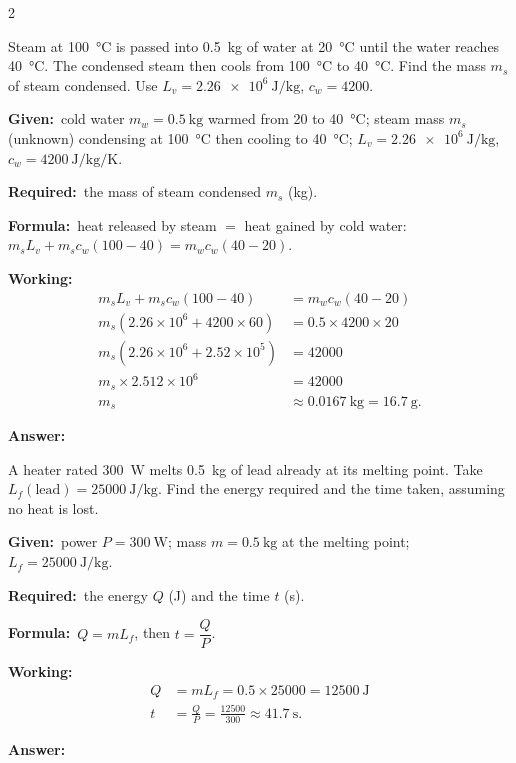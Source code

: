 \documentclass[10pt]{article}
\newcommand{\Given}{\par\vspace{2pt}\textbf{Given:}\ }
\newcommand{\Required}{\par\vspace{2pt}\textbf{Required:}\ }
\newcommand{\Formula}{\par\vspace{2pt}\textbf{Formula:}\ }
\newcommand{\Working}{\par\vspace{2pt}\textbf{Working:}}
\newcommand{\Answer}[1]{\par\vspace{2pt}\textbf{Answer:}\ \fbox{#1}}
\begin{document}
\begin{multicols}{2}
\begin{example}
Steam at \SI{100}{\degreeCelsius} is passed into \SI{0.5}{\kilogram} of
water at \SI{20}{\degreeCelsius} until the water reaches
\SI{40}{\degreeCelsius}. The condensed steam then cools from
\SI{100}{\degreeCelsius} to \SI{40}{\degreeCelsius}. Find the mass $m_s$
of steam condensed. Use
$L_v=\SI{2.26e6}{\joule\per\kilogram}$, $c_w=4200$.
\tcblower
\Given cold water $m_w = \SI{0.5}{\kilogram}$ warmed from
\SI{20}{} to \SI{40}{\degreeCelsius}; steam mass $m_s$ (unknown)
condensing at \SI{100}{\degreeCelsius} then cooling to
\SI{40}{\degreeCelsius}; $L_v=\SI{2.26e6}{\joule\per\kilogram}$,
$c_w=\SI{4200}{\joule\per\kilogram\per\kelvin}$.
\Required the mass of steam condensed $m_s$ (\si{\kilogram}).
\Formula heat released by steam $=$ heat gained by cold water:
$m_s L_v + m_s c_w(100-40) = m_w c_w(40-20)$.
\Working
\begin{align*}
  m_s L_v + m_s c_w(100-40) &= m_w c_w(40-20) \\
  m_s(2.26\times10^{6} + 4200\times60) &= 0.5\times4200\times20 \\
  m_s(2.26\times10^{6} + 2.52\times10^{5}) &= 42000 \\
  m_s \times 2.512\times10^{6} &= 42000 \\
  m_s &\approx \SI{0.0167}{\kilogram} = \SI{16.7}{\gram}.
\end{align*}
\Answer{$m_s \approx \SI{16.7}{\gram}$}
\end{example}

\begin{example}
A heater rated \SI{300}{\watt} melts \SI{0.5}{\kilogram} of lead already
at its melting point. Take $L_f(\text{lead}) =
\SI{25000}{\joule\per\kilogram}$. Find the energy required and the time
taken, assuming no heat is lost.
\tcblower
\Given power $P = \SI{300}{\watt}$; mass $m = \SI{0.5}{\kilogram}$ at
the melting point; $L_f = \SI{25000}{\joule\per\kilogram}$.
\Required the energy $Q$ (\si{\joule}) and the time $t$ (\si{\second}).
\Formula $Q = m L_f$, then $t = \dfrac{Q}{P}$.
\Working
\begin{align*}
  Q &= m L_f = 0.5 \times 25000 = \SI{12500}{\joule} \\
  t &= \frac{Q}{P} = \frac{12500}{300} \approx \SI{41.7}{\second}.
\end{align*}
\Answer{$Q = \SI{12.5}{\kilo\joule}$, $t \approx \SI{41.7}{\second}$}
\end{example}


\end{multicols}
\end{document}
